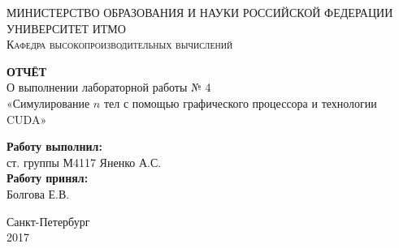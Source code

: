 \documentclass[12pt]{report}
\begin{document}
\def\contentsname{Содержание}

\begin{titlepage}

\begin{center}
\textsc{МИНИСТЕРСТВО ОБРАЗОВАНИЯ И НАУКИ РОССИЙСКОЙ ФЕДЕРАЦИИ\\
УНИВЕРСИТЕТ ИТМО\\
Кафедра высокопроизводительных вычислений
}

\vspace{6.68cm}

\textbf{\large ОТЧЁТ}\\[4.5mm]
О выполнении лабораторной работы № 4\\
«Симулирование $n$ тел с помощью графического процессора и технологии CUDA»\\[18mm]
\end{center}
\hspace{\fill}
\begin{minipage}{.48\textwidth}
\textbf{Работу выполнил:}\\
ст. группы М4117 Яненко А.С.\\
\textbf{Работу принял:}\\
\hspace*{3.25cm} Болгова Е.В.\\
\end{minipage}
\vfill
\begin{center}
Санкт-Петербург\\
2017
\end{center}
\end{titlepage}

\restoregeometry


\setcounter{page}{2}


\end{document}
